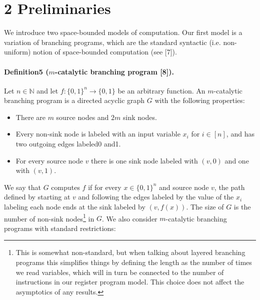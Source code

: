 \section*{2 Preliminaries}
We introduce two space-bounded models of computation. Our first model is a variation of branching programs, which are the standard syntactic (i.e. non-uniform) notion of space-bounded computation (see [7]).
\paragraph{Definition5 ($m$-catalytic branching program [8]).} Let $n\in\mathbb N$ and let $f:\{0,1\}^n\to\{0,1\}$ be an arbitrary function. An $m$-catalytic branching program is a directed acyclic graph $G$ with the following properties:
\begin{itemize}
\item There are $m$ source nodes and $2m$ sink nodes.
\item Every non-sink node is labeled with an input variable $x_i$ for $i\in[n]$, and has two outgoing edges labeled0 and1.
\item For every source node $v$ there is one sink node labeled with $(v,0)$ and one with $(v,1)$.
\end{itemize}
We say that $G$ computes $f$ if for every $x\in\{0,1\}^n$ and source node $v$, the path defined by starting at $v$ and following the edges labeled by the value of the $x_i$ labeling each node ends at the sink labeled by $(v,f(x))$. The size of $G$ is the number of non-sink nodes\footnote{This is somewhat non-standard, but when talking about layered branching programs this simplifies things by defining the length as the number of times we read variables, which will in turn be connected to the number of instructions in our register program model. This choice does not affect the asymptotics of any results.} in $G$.
We also consider $m$-catalytic branching programs with standard restrictions:
